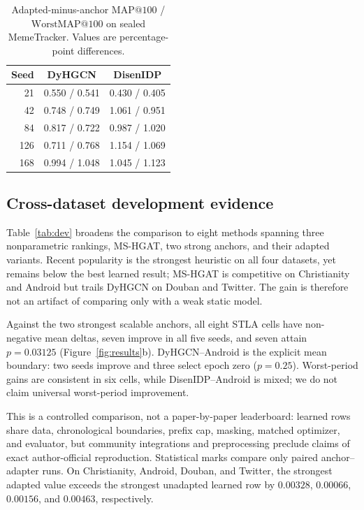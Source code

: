 \documentclass[sigconf,anonymous,review]{acmart}
\makeatletter
\newcommand{\method}{\textsc{STLA}\xspace}
\newcommand{\mapk}{\mathrm{MAP}@100}
\newcommand{\wmap}{\mathrm{WorstMAP}@100}
\makeatother
\begin{document}
\begin{table}[t]
\caption{Adapted-minus-anchor $\mapk$ / $\wmap$ on sealed MemeTracker. Values are percentage-point differences.}
\label{tab:paired}
\centering
\small
\begin{tabular}{rcc}
\toprule
Seed & DyHGCN & DisenIDP\\
\midrule
21  & 0.550 / 0.541 & 0.430 / 0.405\\
42  & 0.748 / 0.749 & 1.061 / 0.951\\
84  & 0.817 / 0.722 & 0.987 / 1.020\\
126 & 0.711 / 0.768 & 1.154 / 1.069\\
168 & 0.994 / 1.048 & 1.045 / 1.123\\
\bottomrule
\end{tabular}
\end{table}

\subsection{Cross-dataset development evidence}
Table~\ref{tab:dev} broadens the comparison to eight methods spanning three nonparametric rankings, MS-HGAT, two strong anchors, and their adapted variants. Recent popularity is the strongest heuristic on all four datasets, yet remains below the best learned result; MS-HGAT is competitive on Christianity and Android but trails DyHGCN on Douban and Twitter. The gain is therefore not an artifact of comparing only with a weak static model.

Against the two strongest scalable anchors, all eight \method cells have non-negative mean deltas, seven improve in all five seeds, and seven attain $p=0.03125$ (Figure~\ref{fig:results}b). DyHGCN--Android is the explicit mean boundary: two seeds improve and three select epoch zero ($p=0.25$). Worst-period gains are consistent in six cells, while DisenIDP--Android is mixed; we do not claim universal worst-period improvement.

This is a controlled comparison, not a paper-by-paper leaderboard: learned rows share data, chronological boundaries, prefix cap, masking, matched optimizer, and evaluator, but community integrations and preprocessing preclude claims of exact author-official reproduction. Statistical marks compare only paired anchor--adapter runs. On Christianity, Android, Douban, and Twitter, the strongest adapted value exceeds the strongest unadapted learned row by $0.00328$, $0.00066$, $0.00156$, and $0.00463$, respectively.
\end{document}
